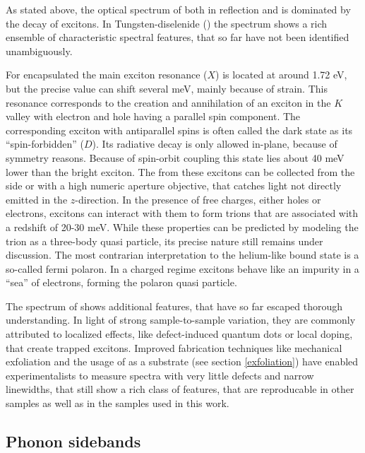 As stated above, the optical spectrum of \tmds both in reflection and \pl is dominated by the decay of excitons. In Tungsten-diselenide (\wse\!) the \pl spectrum shows a rich ensemble of characteristic spectral features, that so far have not been identified unambiguously. 

For \hbng encapsulated \wse the main exciton resonance ($X$) is located at around 1.72 eV, but the precise value can shift several meV, mainly because of strain. This resonance corresponds to the creation and annihilation of an exciton in the $K$ valley with electron and hole having a parallel spin component. The corresponding exciton with antiparallel spins is often called the dark state as its ``spin-forbidden'' ($D$). Its radiative decay is only allowed in-plane, because of symmetry reasons\texttrademark. Because of spin-orbit coupling this state lies about 40 meV lower than the bright exciton\cite{echeverry_splitting_2016}. The \pl from these excitons can be collected from the side or with a high numeric aperture objective, that catches light not directly emitted in the $z$-direction\cite{robert_fine_2017, wang_-plane_2017}. In the presence of free charges, either holes or electrons, excitons can interact with them to form trions that are associated with a redshift of 20-30 meV\cite{courtade_charged_2017}. While these properties can be predicted by modeling the trion as a three-body quasi particle, its precise nature still remains under discussion. The most contrarian interpretation to the helium-like bound state is a so-called fermi polaron. In a charged regime excitons behave like an impurity in a ``sea'' of electrons, forming the polaron quasi particle\cite{sidler_fermi_2016, efimkin_many-body_2017,schmidt_fermi_2012}.

The spectrum of \wse shows additional features, that have so far escaped thorough understanding. In light of strong sample-to-sample variation, they are commonly attributed to localized effects, like defect-induced quantum dots or local doping\cite{kato_optical_2014, zhang_defect_2017}, that create trapped excitons. Improved fabrication techniques like mechanical exfoliation and the usage of \hbng as a substrate (see section \ref{exfoliation}) have enabled experimentalists to measure spectra with very little defects and narrow linewidths, that still show a rich class of features, that are reproducable in other samples as well as in the samples used in this work.

\subsection{Phonon sidebands}\label{sidebands}

